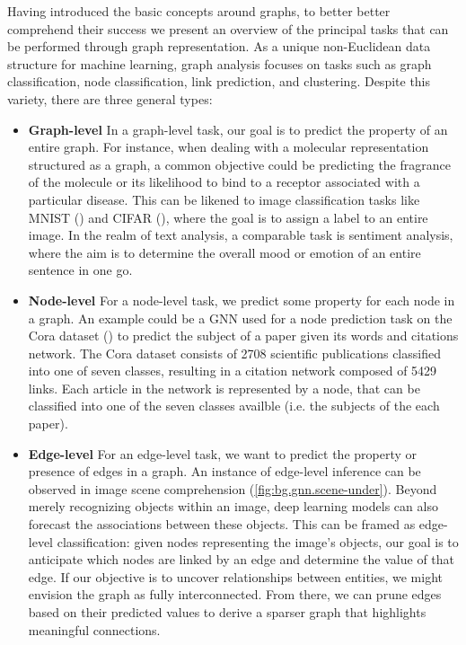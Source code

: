 \documentclass[binding=0.6cm]{sapthesis}
\newcommand{\mycite}[1]{(\cite{#1})}
\begin{document}
Having introduced the basic concepts around graphs, to better better comprehend their success we present an overview of the principal tasks that can be performed through graph representation. As a unique non-Euclidean data structure for machine learning, graph analysis focuses on tasks such as graph classification, node classification, link prediction, and clustering. Despite this variety, there are three general types:
\begin{itemize}
    \item \textbf{Graph-level} In a graph-level task, our goal is to predict the property of an entire graph. For instance, when dealing with a molecular representation structured as a graph, a common objective could be predicting the fragrance of the molecule or its likelihood to bind to a receptor associated with a particular disease. This can be likened to image classification tasks like MNIST \mycite{lecun1998-mnist} and CIFAR \mycite{cifair10}, where the goal is to assign a label to an entire image. In the realm of text analysis, a comparable task is sentiment analysis, where the aim is to determine the overall mood or emotion of an entire sentence in one go.
    
    \item \textbf{Node-level} For a node-level task, we predict some property for each node in a graph. An example could be a GNN used for a node prediction task on the Cora dataset (\cite{mcCallum2000-cora}) to predict the subject of a paper given its words and citations network. The Cora dataset consists of 2708 scientific publications classified into one of seven classes, resulting in a citation network composed of 5429 links. Each article in the network is represented by a node, that can be classified into one of the seven classes availble (i.e. the subjects of the each paper).
    
    \item \textbf{Edge-level} For an edge-level task, we want to predict the property or presence of edges in a graph. An instance of edge-level inference can be observed in image scene comprehension (\cref{fig:bg.gnn.scene-under}). Beyond merely recognizing objects within an image, deep learning models can also forecast the associations between these objects. This can be framed as edge-level classification: given nodes representing the image's objects, our goal is to anticipate which nodes are linked by an edge and determine the value of that edge. If our objective is to uncover relationships between entities, we might envision the graph as fully interconnected. From there, we can prune edges based on their predicted values to derive a sparser graph that highlights meaningful connections.
\end{itemize}
\end{document}
